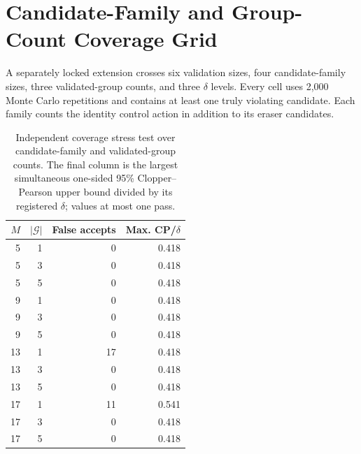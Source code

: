 \section{Candidate-Family and Group-Count Coverage Grid}
A separately locked extension crosses six validation sizes, four candidate-family sizes, three validated-group counts, and three $\delta$ levels. Every cell uses 2,000 Monte Carlo repetitions and contains at least one truly violating candidate. Each family counts the identity control action in addition to its eraser candidates.
\begin{table}[t]
\centering\small
\begin{tabular}{rrrr}
\toprule
$M$ & $|\mathcal G|$ & False accepts & Max. CP/$\delta$ \\
\midrule
5 & 1 & 0 & 0.418 \\
5 & 3 & 0 & 0.418 \\
5 & 5 & 0 & 0.418 \\
9 & 1 & 0 & 0.418 \\
9 & 3 & 0 & 0.418 \\
9 & 5 & 0 & 0.418 \\
13 & 1 & 17 & 0.418 \\
13 & 3 & 0 & 0.418 \\
13 & 5 & 0 & 0.418 \\
17 & 1 & 11 & 0.541 \\
17 & 3 & 0 & 0.418 \\
17 & 5 & 0 & 0.418 \\
\bottomrule
\end{tabular}
\caption{Independent coverage stress test over candidate-family and validated-group counts. The final column is the largest simultaneous one-sided 95\% Clopper--Pearson upper bound divided by its registered $\delta$; values at most one pass.}
\label{tab:family-grid}
\end{table}
